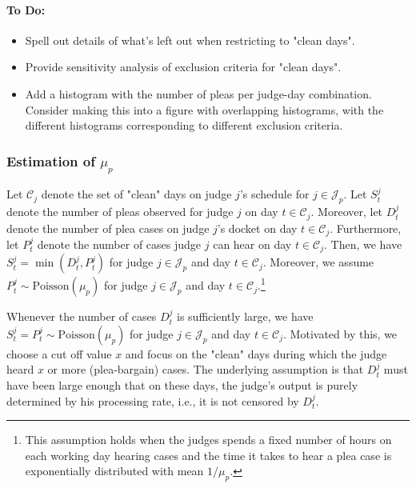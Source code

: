 \documentclass[11pt, oneside]{article}   	%
\theoremstyle{ModifiedStyle}
\begin{document}
\paragraph{To Do:}
\begin{itemize}
	\item Spell out details of what's left out when restricting to "clean days".
	\item Provide sensitivity analysis of exclusion criteria for "clean days".
	\item Add a histogram with the number of pleas per judge-day combination. Consider making this into a figure with overlapping histograms, with the different histograms corresponding to different exclusion criteria.
\end{itemize}

\subsubsection{Estimation of $\mu_p$}
\label{Sec:Estimation:Capacity_Estimation:Plea_Capacity}
Let $\mathcal{C}_j$ denote the set of "clean" days on judge $j$'s schedule for $j\in\mathcal{J}_p$. Let $S^j_t$ denote the number of pleas observed for judge $j$ on day $t\in\mathcal{C}_j$. Moreover, let $D^j_t$ denote the number of plea cases on judge $j$'s docket on day $t\in\mathcal{C}_j$. Furthermore, let $P^j_t$ denote the number of cases judge $j$ can hear on day $t\in\mathcal{C}_j$. Then, we have $S^j_t = \min(D^j_t,P^j_t)$ for judge $j\in\mathcal{J}_p$ and day $t\in\mathcal{C}_j$. Moreover, we assume $P^j_t \sim \text{Poisson}(\mu_p)$ for judge $j\in\mathcal{J}_p$ and day $t\in\mathcal{C}_j$.\footnote{This assumption holds when the judges spends a fixed number of hours on each working day hearing cases and the time it takes to hear a plea case is exponentially distributed with mean $1/\mu_p$.}

Whenever the number of cases $D^j_t$ is sufficiently large, we have $S^j_t = P^j_t \sim \text{Poisson}(\mu_p)$ for judge $j\in\mathcal{J}_p$ and day $t\in\mathcal{C}_j$. Motivated by this, we choose a cut off value $x$ and focus on the "clean" days during which the judge heard $x$ or more (plea-bargain) cases. The underlying assumption is that $D^j_t$ must have been large enough that on these days, the judge's output is purely determined by his processing rate, i.e., it is not censored by $D^j_t$.
\end{document}
